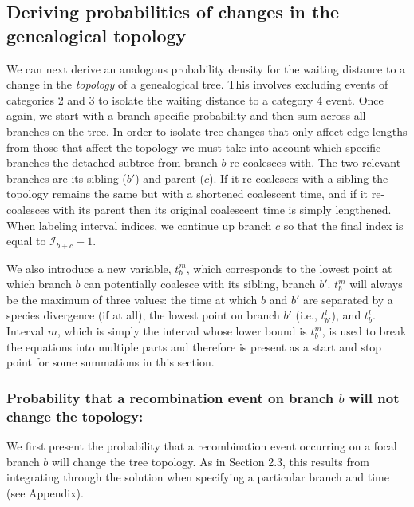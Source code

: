 \documentclass[11pt]{article}
\begin{document}
\subsection{Deriving probabilities of changes in the genealogical topology}

We can next derive an analogous probability density for the waiting distance 
to a change in the \emph{topology} of a genealogical tree. This involves excluding 
events of categories 2 and 3 to isolate the waiting distance to a category 4 event. 
Once again, we start with a branch-specific probability and then sum across all 
branches on the tree. In order to isolate tree changes that only affect edge
lengths from those that affect the topology we must take into account which 
specific branches the detached subtree from branch $b$ re-coalesces with. 
The two relevant branches are its sibling ($b'$) and parent ($c$). If it re-coalesces
with a sibling the topology remains the same but with a shortened 
coalescent time, and if it re-coalesces with its parent then its 
original coalescent time is simply lengthened. 
When labeling interval indices, we continue up branch $c$ so that the final index 
is equal to $\mathcal{I}_{b+c}-1$. 

We also introduce a new variable, $t_b^m$, which corresponds to the lowest point
at which branch $b$ can potentially coalesce with its sibling, branch $b'$. 
$t_b^m$ will always be the maximum of three values: the time at which $b$ and 
$b'$ are separated by a species divergence (if at all), the lowest point on 
branch $b'$ (i.e., $t_{b'}^l$), and $t_b^l$. Interval
$m$, which is simply the interval whose lower bound is $t_b^m$, is used to break 
the equations into multiple parts and therefore is present as a start and 
stop point for some summations in this section.

\subsubsection{Probability that a recombination event on branch $b$ will not change the topology:}

We first present the probability that a recombination event occurring on a focal branch $b$ will change the tree topology. As in Section 2.3, this results from integrating through the solution when specifying a particular branch and time (see Appendix). 
\end{document}
